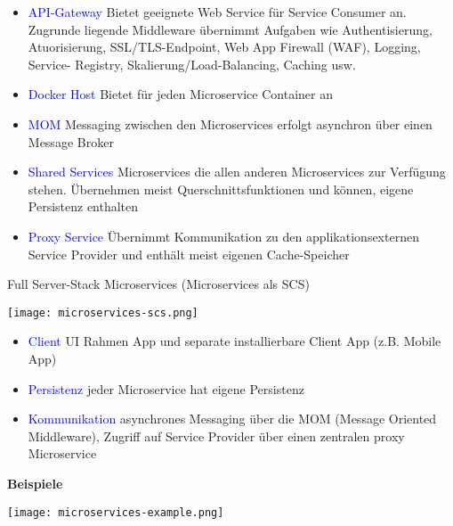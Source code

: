 \begin{itemize}
    \item \textcolor{blue}{API-Gateway} Bietet geeignete Web Service für Service Consumer an. Zugrunde liegende Middleware übernimmt Aufgaben wie Authentisierung, Atuorisierung, SSL/TLS-Endpoint, Web App Firewall (WAF), Logging, Service-
        Registry, Skalierung/Load-Balancing, Caching usw.
    \item \textcolor{blue}{Docker Host} Bietet für jeden Microservice Container an
    \item \textcolor{blue}{MOM} Messaging zwischen den Microservices erfolgt asynchron über einen Message Broker
    \item \textcolor{blue}{Shared Services} Microservices die allen anderen Microservices zur Verfügung stehen. Übernehmen meist Querschnittsfunktionen und können, eigene Persistenz enthalten
    \item \textcolor{blue}{Proxy Service} Übernimmt Kommunikation zu den applikationsexternen Service Provider und enthält meist eigenen Cache-Speicher
\end{itemize}
\vfill\null
\columnbreak
Full Server-Stack Microservices (Microservices als SCS)

\texttt{[image: microservices-scs.png]}

\begin{itemize}
    \item \textcolor{blue}{Client} UI Rahmen App und separate installierbare Client App (z.B. Mobile App)
    \item \textcolor{blue}{Persistenz} jeder Microservice hat eigene Persistenz
    \item \textcolor{blue}{Kommunikation} asynchrones Messaging über die MOM (Message Oriented Middleware), Zugriff auf Service Provider über einen zentralen proxy Microservice
\end{itemize}
\vspace{10pt}

\textbf{Beispiele}

\texttt{[image: microservices-example.png]}

